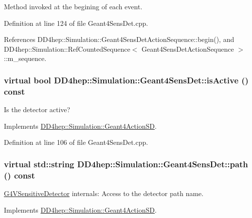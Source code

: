 Method invoked at the begining of each event. 

Definition at line 124 of file Geant4SensDet.cpp.

References DD4hep::Simulation::Geant4SensDetActionSequence::begin(), and DD4hep::Simulation::RefCountedSequence$<$ Geant4SensDetActionSequence $>$::m\_\-sequence.\hypertarget{class_d_d4hep_1_1_simulation_1_1_geant4_sens_det_a862cd7e6673249aaf71da2eda32c4777}{
\subsubsection[{isActive}]{\setlength{\rightskip}{0pt plus 5cm}virtual bool DD4hep::Simulation::Geant4SensDet::isActive () const}}
\label{class_d_d4hep_1_1_simulation_1_1_geant4_sens_det_a862cd7e6673249aaf71da2eda32c4777}


Is the detector active? 

Implements \hyperlink{class_d_d4hep_1_1_simulation_1_1_geant4_action_s_d_a2c3791fc610294f1d3fc9ff6fe0e755f}{DD4hep::Simulation::Geant4ActionSD}.

Definition at line 106 of file Geant4SensDet.cpp.\hypertarget{class_d_d4hep_1_1_simulation_1_1_geant4_sens_det_ab5c9a049efc9b8e19c75fc11aa1622cc}{
\subsubsection[{path}]{\setlength{\rightskip}{0pt plus 5cm}virtual std::string DD4hep::Simulation::Geant4SensDet::path () const}}
\label{class_d_d4hep_1_1_simulation_1_1_geant4_sens_det_ab5c9a049efc9b8e19c75fc11aa1622cc}


\hyperlink{class_g4_v_sensitive_detector}{G4VSensitiveDetector} internals: Access to the detector path name. 

Implements \hyperlink{class_d_d4hep_1_1_simulation_1_1_geant4_action_s_d_a8d3333538a535ac963931173f15acfeb}{DD4hep::Simulation::Geant4ActionSD}.

